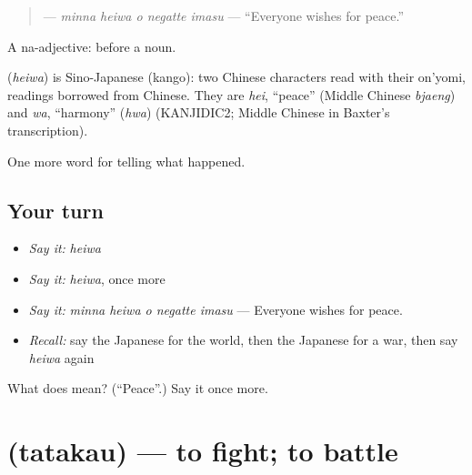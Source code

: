 \begin{quote}
\textbf{  } — \emph{minna heiwa o negatte imasu} — \textquotedblleft{}Everyone wishes for peace.\textquotedblright{}
\end{quote}

A na-adjective:  before a noun.

\begin{cousinweb}
\textbf{} (\emph{heiwa}) is Sino-Japanese (kango): two Chinese characters read with their on'yomi, readings borrowed from Chinese. They are \emph{hei}, \textquotedblleft{}peace\textquotedblright{} (Middle Chinese \emph{bjaeng}) and \emph{wa}, \textquotedblleft{}harmony\textquotedblright{} (\emph{hwa}) (KANJIDIC2; Middle Chinese in Baxter's transcription).
\end{cousinweb}

\begin{grammarlens}[title={What you've built}]
One more word for telling what happened.
\end{grammarlens}

\subsection*{Your turn}
\begin{itemize}
\raggedright
  \item \emph{Say it:} \emph{heiwa}
  \item \emph{Say it:} \emph{heiwa}, once more
  \item \emph{Say it:} \emph{minna heiwa o negatte imasu} — Everyone wishes for peace.
  \item \emph{Recall:} say the Japanese for the world, then the Japanese for a war, then say \emph{heiwa} again
\end{itemize}

\begin{tcolorbox}[breakable,colback=teal!4,colframe=teal!35!black,title={Before you move on}]
What does  mean? (\textquotedblleft{}Peace\textquotedblright{}.) Say it once more.
\end{tcolorbox}
\section[\texorpdfstring{\ja{たたかう} (tatakau)}{たたかう (tatakau)}]{ (tatakau) — to fight; to battle}

\label{lesson:JA-C282-tatakau}



